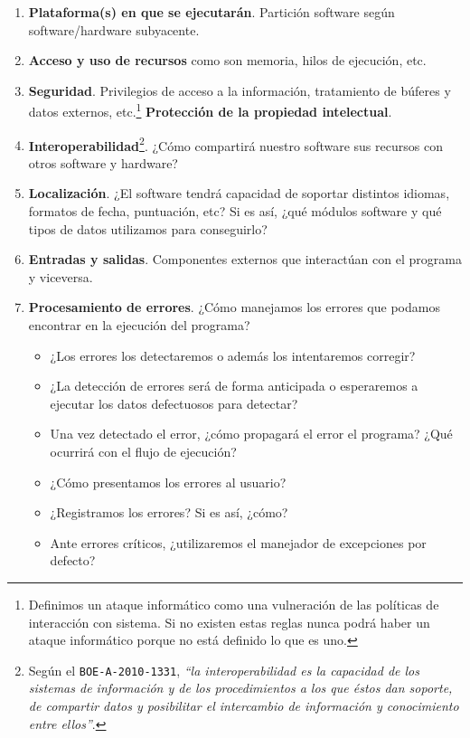 \begin{enumerate}
    \item \textbf{Plataforma(s) en que se ejecutarán}. Partición software según software/hardware
          subyacente.
    \item \textbf{Acceso y uso de recursos} como son memoria, hilos de ejecución, etc.
    \item \textbf{Seguridad}. Privilegios de acceso a la información, tratamiento de búferes
          y datos externos, etc.\footnote{
            Definimos un ataque informático como una vulneración de las políticas de
            interacción con sistema. Si no existen estas reglas nunca podrá haber un
            ataque informático porque no está definido lo que es uno.
          } \textbf{Protección de la propiedad intelectual}.
    \item \textbf{Interoperabilidad}\footnote{Según el \texttt{BOE-A-2010-1331}, \textit{``la interoperabilidad
          es la capacidad de los sistemas de información y de los procedimientos a los que éstos dan soporte,
          de compartir datos y posibilitar el intercambio de información y conocimiento entre ellos''}.}. ¿Cómo compartirá nuestro software sus recursos con otros
          software y hardware?
    \item \textbf{Localización}. ¿El software tendrá capacidad de soportar distintos
          idiomas, formatos de fecha, puntuación, etc? Si es así, ¿qué módulos software y qué
          tipos de datos utilizamos para conseguirlo?
    \item \textbf{Entradas y salidas}. Componentes externos que interactúan con el programa y viceversa.
    \item \textbf{Procesamiento de errores}. ¿Cómo manejamos los errores que podamos encontrar en 
          la ejecución del programa?
        \begin{itemize}[noitemsep,nolistsep]
            \item ¿Los errores los detectaremos o además los intentaremos corregir?
            \item ¿La detección de errores será de forma anticipada o esperaremos a ejecutar
                  los datos defectuosos para detectar?
            \item Una vez detectado el error, ¿cómo propagará el error el programa? ¿Qué ocurrirá
                  con el flujo de ejecución?
            \item ¿Cómo presentamos los errores al usuario?
            \item ¿Registramos los errores? Si es así, ¿cómo?
            \item Ante errores críticos, ¿utilizaremos el manejador de excepciones por defecto?
        \end{itemize}
\end{enumerate}

